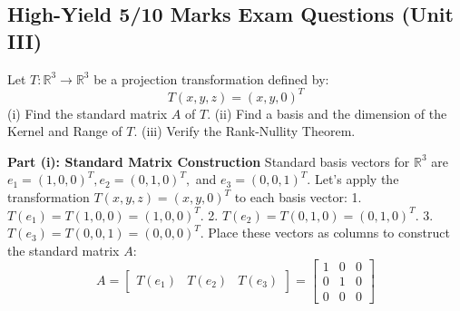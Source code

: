 \documentclass[11pt,a4paper]{article}
\begin{document}
\subsection{High-Yield 5/10 Marks Exam Questions (Unit III)}

\begin{questionbox}
Let $T: \mathbb{R}^3 \to \mathbb{R}^3$ be a projection transformation defined by:
\[ T(x, y, z) = (x, y, 0)^T \]
(i) Find the standard matrix $A$ of $T$. 
(ii) Find a basis and the dimension of the Kernel and Range of $T$. 
(iii) Verify the Rank-Nullity Theorem.
\end{questionbox}

\begin{solutionbox}
\textbf{Part (i): Standard Matrix Construction}
Standard basis vectors for $\mathbb{R}^3$ are $e_1 = (1,0,0)^T, e_2 = (0,1,0)^T,$ and $e_3 = (0,0,1)^T$.
Let's apply the transformation $T(x,y,z) = (x,y,0)^T$ to each basis vector:
1. $T(e_1) = T(1,0,0) = (1,0,0)^T$.
2. $T(e_2) = T(0,1,0) = (0,1,0)^T$.
3. $T(e_3) = T(0,0,1) = (0,0,0)^T$.
Place these vectors as columns to construct the standard matrix $A$:
\[ A = \begin{bmatrix} T(e_1) & T(e_2) & T(e_3) \end{bmatrix} = \begin{bmatrix} 1 & 0 & 0 \\ 0 & 1 & 0 \\ 0 & 0 & 0 \end{bmatrix} \]


\end{solutionbox}
\end{document}
